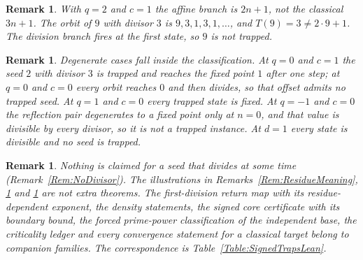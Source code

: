 \documentclass[11pt,letterpaper]{article}
\newtheorem{remark}[theorem]{Remark}
\begin{document}
\begin{remark}\label{Rem:NotClassical}
With \(q=2\) and \(c=1\) the affine branch is \(2n+1\), not the classical
\(3n+1\). The orbit of \(9\) with divisor \(3\) is \(9,3,1,3,1,\dots\), and
\(T(9)=3\ne2\cdot9+1\). The division branch fires at the first state, so
\(9\) is not trapped.
\end{remark}

\begin{remark}\label{Rem:Degenerate}
Degenerate cases fall inside the classification. At \(q=0\) and \(c=1\) the
seed \(2\) with divisor \(3\) is trapped and reaches the fixed point \(1\) after
one step; at \(q=0\) and \(c=0\) every orbit reaches \(0\) and then divides, so that offset
admits no trapped seed. At \(q=1\) and \(c=0\) every trapped state is fixed. At
\(q=-1\) and \(c=0\) the reflection pair degenerates to a fixed point only at
\(n=0\), and that value is divisible by every divisor, so it is not a trapped
instance. At \(d=1\) every state is divisible and no seed is trapped.
\end{remark}

\begin{remark}\label{Rem:Scope}
Nothing is claimed for a seed that divides at some time
(Remark~\ref{Rem:NoDivisor}). The illustrations in
Remarks~\ref{Rem:ResidueMeaning}, \ref{Rem:NotClassical} and
\ref{Rem:Degenerate} are not extra theorems. The first-division return map
with its residue-dependent exponent, the density statements, the signed core
certificate with its boundary bound, the forced prime-power classification of
the independent base, the criticality ledger and every convergence statement
for a classical target belong to companion families. The correspondence is
Table~\ref{Table:SignedTrapsLean}.
\end{remark}
\end{document}
